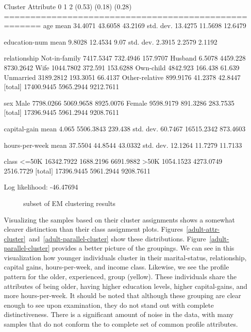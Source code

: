 \documentclass{sig-alternate}
\begin{document}
\tiny
\begin{verbbox}
                     Cluster
Attribute                  0           1           2
                      (0.53)      (0.18)      (0.28)
=====================================================
age
  mean                34.4071     43.6058     43.2169
  std. dev.           13.4275     11.5698     12.6479

education-num
  mean                 9.8028     12.4534        9.07
  std. dev.            2.3915      2.2579      2.1192

relationship
   Not-in-family    7417.5347    732.4946    157.9707
   Husband             6.5078    4459.228   8730.2642
   Wife             1044.7802     372.591    153.6288
   Own-child         4842.923     166.438      61.639
   Unmarried        3189.2812    193.3051     66.4137
   Other-relative    899.9176     41.2378     42.8447
  [total]          17400.9445   5965.2944   9212.7611

sex
   Male             7798.0266   5069.9658   8925.0076
   Female           9598.9179    891.3286    283.7535
  [total]          17396.9445   5961.2944   9208.7611

capital-gain
  mean                  4.065   5506.3843     239.438
  std. dev.           60.7467  16515.2342    873.4603

hours-per-week
  mean                37.5504     44.8544     43.0332
  std. dev.           12.1264     11.7279     11.7133

class
   <=50K           16342.7922   1688.2196   6691.9882
   >50K             1054.1523   4273.0749   2516.7729
  [total]          17396.9445   5961.2944   9208.7611


Log likelihood: -46.47694
\end{verbbox}
\normalsize

\begin{figure}[!htbp]
    \centering
    \theverbbox
    \caption{subset of EM clustering results\label{em-summary}}
\end{figure}

Visualizing the samples based on their cluster assignments shows a somewhat clearer distinction than their class assignment plots. Figures~\ref{adult-attr-cluster}~and~\ref{adult-parallel-cluster} show these distributions. Figure~\ref{adult-parallel-cluster} provides a better picture of the groupings. We can see in this visualization how younger individuals cluster in their marital-status, relationship, capital gains, hours-per-week, and income class. Likewise, we see the profile pattern for the older, experienced, group (yellow). These individuals share the attributes of being older, having higher education levels, higher capital-gains, and more hours-per-week. It should be noted that although these grouping are clear enough to see upon examination, they do not stand out with complete distinctiveness. There is a significant amount of noise in the data, with many samples that do not conform the to complete set of common profile attributes.
\end{document}
